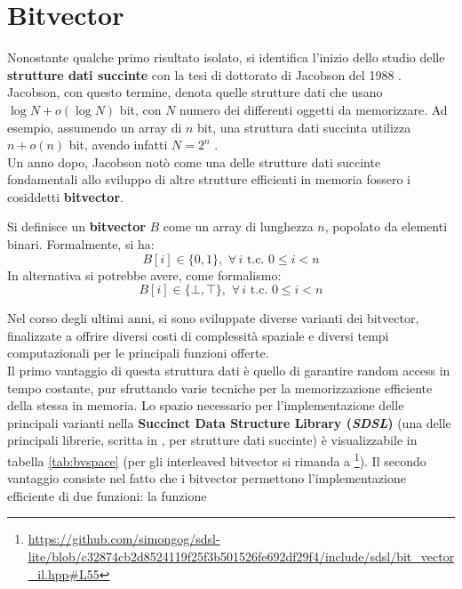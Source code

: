 \section{Bitvector}
\label{bvsec}
Nonostante qualche primo risultato isolato, si identifica l'inizio dello studio
delle \textbf{strutture dati succinte} con la tesi di 
dottorato di Jacobson 
del 1988 \cite{succinct}.
Jacobson, con questo termine, denota quelle strutture dati che
usano $\log N+o(\log N)$
bit, con $N$ numero dei differenti oggetti da memorizzare.
Ad esempio, assumendo un array di $n$ bit, una struttura dati succinta
utilizza $n+o(n)$ bit, avendo infatti $N=2^n$ \cite{navarro}.\\
Un anno dopo, Jacobson \cite{jacobson} notò come una delle strutture
  dati succinte fondamentali allo sviluppo di altre strutture efficienti in
memoria fossero i cosiddetti \textbf{bitvector}.
\begin{definizione}
  Si definisce un \textbf{bitvector} $B$ come un array di lunghezza $n$,
  popolato da elementi binari. Formalmente, si ha:
  \begin{equation}
    \label{eq:bvdef1}
    B[i]\in\{0,1\},\,\,\forall\, i \mbox{ t.c. } 0\leq i < n
  \end{equation}
  In alternativa si potrebbe avere, come formalismo:
  \begin{equation}
    \label{eq:bvdef2}
    B[i]\in\{\bot,\top\},\,\,\forall\, i \mbox{ t.c. } 0\leq i < n
  \end{equation}
\end{definizione}
Nel corso degli ultimi anni, si sono sviluppate diverse varianti dei
bitvector, finalizzate a offrire diversi costi di complessità spaziale
e 
diversi tempi computazionali per le principali funzioni offerte.\\
Il primo vantaggio di questa struttura dati è quello di garantire random
  access in tempo costante, pur 
sfruttando varie tecniche per la memorizzazione efficiente della stessa in
memoria. Lo spazio necessario per l'implementazione delle principali varianti
nella \textbf{Succinct Data Structure Library (\textit{SDSL})} 
\cite{sdsl} (una delle principali librerie, scritta in , per
strutture dati succinte) è visualizzabile in tabella 
\ref{tab:bvspace} (per gli interleaved bitvector si rimanda
a \footnote{\scriptsize{\url{https://github.com/simongog/sdsl-lite/blob/c32874cb2d8524119f25f3b501526fe692df29f4/include/sdsl/bit\_vector\_il.hpp\#L55}}}). Il
secondo vantaggio consiste nel fatto che i 
bitvector permettono l'implementazione efficiente di due funzioni: la funzione
